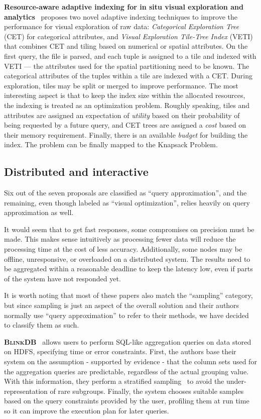 \textbf{Resource-aware adaptive indexing for in situ visual exploration and
analytics}~\cite{maroulis_resource-aware_2023} proposes two novel adaptive indexing techniques
to improve the performance for visual exploration of raw data:
\textit{Categorical Exploration Tree} (CET) for categorical attributes, and \textit{Visual Exploration
Tile-Tree Index} (VETI) that combines CET and tiling based on numerical or spatial attributes.
On the first query, the file is parsed, and each tuple is assigned to a tile and indexed with VETI
--- the attributes used for the spatial partitioning need to be known. The categorical attributes
of the tuples within a tile are indexed with a CET. During exploration, tiles may be split or merged
to improve performance. The most interesting aspect is that to keep the index size within
the allocated resources, the indexing is treated as an optimization problem. Roughly speaking,
tiles and attributes are assigned an expectation of \textit{utility} based on their probability of
being requested by a future query, and CET trees are assigned a \textit{cost} based on their memory
requirement. Finally, there is an available \textit{budget} for building the index.
The problem can be finally mapped to the Knapsack Problem.

\subsection{Distributed and interactive}
Six out of the seven proposals are classified as ``query approximation'', and the 
remaining, even though labeled as ``visual optimization'',
relies heavily on query approximation as well.

It would seem that to get fast responses, some compromises on precision 
must be made. This makes sense intuitively as processing fewer 
data will reduce the processing time at the cost of less accuracy. 
Additionally, some nodes may be offline, 
unresponsive, or overloaded on a distributed system. The results 
need to be aggregated within a reasonable deadline to keep the latency low, even if parts of the system 
have not responded yet.

It is worth noting that most of these papers also match the ``sampling''
category, but since sampling is just an aspect of the overall solution and their 
authors normally use ``query approximation'' to refer to their methods, we have 
decided to classify them as such.

\medskip

\textbf{\textsc{BlinkDB}}~\cite{Agarwal2013} allows users to perform SQL-like aggregation 
queries on data stored on HDFS, specifying time or error constraints. First, 
the authors base their system on the assumption - supported by evidence - that 
the column sets used for the aggregation queries are predictable, regardless of 
the actual grouping value. With this information, they perform a stratified 
sampling~\cite{Lohr2009} to avoid the under-representation of rare subgroups. 
Finally, the system chooses suitable samples based on the query constraints 
provided by the user, profiling them at run time so it can improve the 
execution plan for later queries.

